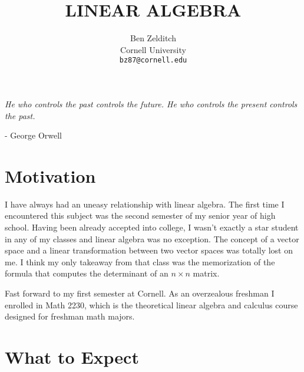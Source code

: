\documentclass[paper=a4, fontsize=11pt,twoside]{scrartcl}   %
\title{  
            \LARGE \textbf{\uppercase{Linear Algebra}}    %
}
\author{
        Ben Zelditch\\   
        Cornell University\\  
        \texttt{bz87@cornell.edu} \\
}
\makeatletter
\def\printtitle{%
    {\centering \@title\par}}
\def\printauthor{%
    {\centering \large \@author}}
\makeatother
\begin{document}
\thispagestyle{empty}       %

\printtitle                 %
    \vfill
\printauthor                %
\newpage

 \textit{He who controls the past controls the future. He who controls the present controls the past.} 
 
 \vskip 1mm
		- George Orwell
\section{Motivation}

I have always had an uneasy relationship with linear algebra. The first time I encountered this subject was
the second semester of my senior year of high school. Having been already accepted into college, I wasn't exactly
a star student in any of my classes and linear algebra was no exception. The concept of a vector space and a linear transformation between two
vector spaces was totally lost on me. I think my only takeaway from that class was the memorization of the formula that
computes the determinant of an $n \times n$ matrix. 

Fast forward
to my first semester at Cornell. As an overzealous freshman I enrolled in Math 2230, which is the theoretical linear algebra and calculus course designed
for freshman math majors. 

\section{What to Expect}
\end{document}
